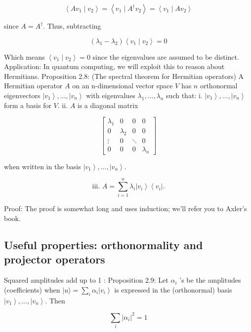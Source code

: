 \documentclass[main.tex]{subfiles}
\begin{document}
    $$
    \left\langle A v_{1} \mid v_{2}\right\rangle=\left\langle v_{1} \mid A^{\dagger} v_{2}\right\rangle=\left\langle v_{1} \mid A v_{2}\right\rangle
    $$
    
    since $A=A^{\dagger}$. Thus, subtracting
    
    $$
    \left(\lambda_{1}-\lambda_{2}\right)\left\langle v_{1} \mid v_{2}\right\rangle=0
    $$
    
    Which means $\left\langle v_{1} \mid v_{2}\right\rangle=0$ since the eigenvalues are assumed to be distinct. Application: In quantum computing, we will exploit this to reason about Hermitians. Proposition 2.8: (The spectral theorem for Hermitian operators) A Hermitian operator $A$ on an n-dimensional vector space $V$ has $n$ orthonormal eigenvectors $\left|v_{1}\right\rangle, \ldots,\left|v_{n}\right\rangle$ with eigenvalues $\lambda_{1}, \ldots, \lambda_{n}$ such that: i. $\left|v_{1}\right\rangle, \ldots,\left|v_{n}\right\rangle$ form a basis for $V$. ii. $A$ is a diagonal matrix
    
    $$
    \left[\begin{array}{cccc}
    \lambda_{1} & 0 & 0 & 0 \\
    0 & \lambda_{2} & 0 & 0 \\
    \vdots & 0 & \ddots & 0 \\
    0 & 0 & 0 & \lambda_{n}
    \end{array}\right]
    $$
    
    when written in the basis $\left|v_{1}\right\rangle, \ldots,\left|v_{n}\right\rangle$.
    
    $$
    \text { iii. } A=\sum_{i=1}^{n} \lambda_{i}\left|v_{i}\right\rangle\left\langle v_{i}\right| \text {. }
    $$
    
    Proof: The proof is somewhat long and uses induction; we'll refer you to Axler's book.
    
\subsection{Useful properties: orthonormality and projector operators}

    Squared amplitudes add up to 1 : Proposition 2.9: Let $\alpha_{i}$ 's be the amplitudes (coefficients) when $|u\rangle=\sum_{i} \alpha_{i}\left|v_{i}\right\rangle$ is expressed in the (orthonormal) basis $\left|v_{1}\right\rangle, \ldots,\left|v_{n}\right\rangle$. Then
    
    $$
    \sum_{i}\left|\alpha_{i}\right|^{2}=1
    $$
    
\end{document}
